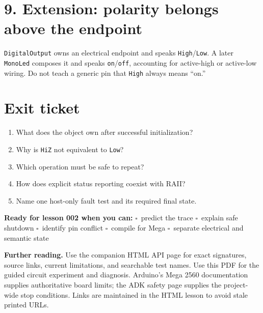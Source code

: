 \documentclass[11pt]{article}
\newcommand{\checkbox}{\(\square\)}
\begin{document}
\section*{9. Extension: polarity belongs above the endpoint}

\texttt{DigitalOutput} owns an electrical endpoint and speaks
\texttt{High}/\texttt{Low}. A later \texttt{MonoLed} composes it and speaks
\texttt{on}/\texttt{off}, accounting for active-high or active-low wiring.
Do not teach a generic pin that \texttt{High} always means ``on.''

\begin{center}
\end{center}

\section*{Exit ticket}

\begin{enumerate}
    \item What does the object own after successful initialization?
    \item Why is \texttt{HiZ} not equivalent to \texttt{Low}?
    \item Which operation must be safe to repeat?
    \item How does explicit status reporting coexist with RAII?
    \item Name one host-only fault test and its required final state.
\end{enumerate}

\textbf{Ready for lesson 002 when you can:}
\checkbox\ predict the trace \quad
\checkbox\ explain safe shutdown \quad
\checkbox\ identify pin conflict \quad
\checkbox\ compile for Mega \quad
\checkbox\ separate electrical and semantic state

\vfill
\small
\textbf{Further reading.}
Use the companion HTML API page for exact signatures, source links, current
limitations, and searchable test names. Use this PDF for the guided circuit
experiment and diagnosis.
Arduino's Mega 2560 documentation supplies authoritative board limits; the ADK
safety page supplies the project-wide stop conditions. Links are maintained in
the HTML lesson to avoid stale printed URLs.
\end{document}
